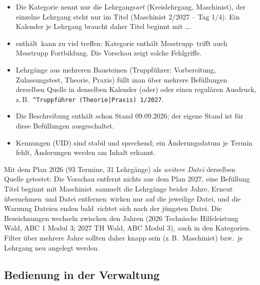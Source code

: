 \documentclass[a4paper,fontsize=10pt]{scrartcl}
\newcommand{\code}[1]{\texttt{#1}}
\begin{document}
\begin{itemize}
  \item Die Kategorie nennt nur die Lehrgangs\emph{art} (\glqq Kreislehrgang,
        Maschinist\grqq), der einzelne Lehrgang steht nur im Titel
        (\glqq Maschinist 2/2027 – Tag 1/4\grqq). Ein Kalender je Lehrgang
        braucht daher \glqq Titel beginnt mit \dots\grqq.
  \item \glqq enthält\grqq\ kann zu viel treffen: Kategorie enthält
        \glqq Messtrupp\grqq\ trifft auch \glqq Messtrupp Fortbildung\grqq.
        Die Vorschau zeigt solche Fehlgriffe.
  \item Lehrgänge aus mehreren Bausteinen (Truppführer: Vorbereitung,
        Zulassungstest, Theorie, Praxis) füllt man über mehrere Befüllungen
        derselben Quelle in denselben Kalender (\glqq oder\grqq) oder einen
        regulären Ausdruck, z.\,B.\ \code{\textasciicircum Truppführer (Theorie|Praxis) 1/2027}.
  \item Die Beschreibung enthält schon \glqq Stand 09.09.2026\grqq; der
        eigene Stand ist für diese Befüllungen ausgeschaltet.
  \item Kennungen (UID) sind stabil und sprechend; ein Änderungsdatum je
        Termin fehlt, Änderungen werden am Inhalt erkannt.
\end{itemize}

Mit dem Plan 2026 (93 Termine, 31 Lehrgänge) als \emph{weitere Datei} derselben
Quelle getestet: Die Vorschau entfernt nichts aus dem Plan 2027, eine
Befüllung \glqq Titel beginnt mit Maschinist\grqq\ sammelt die Lehrgänge
beider Jahre, \glqq Erneut übernehmen\grqq\ und \glqq Datei entfernen\grqq\
wirken nur auf die jeweilige Datei, und die Warnung \glqq Dateien enden
bald\grqq\ richtet sich nach der jüngsten Datei. Die Bezeichnungen wechseln
zwischen den Jahren (2026 \glqq Technische Hilfeleistung Wald\grqq, \glqq ABC 1
Modul 3\grqq; 2027 \glqq TH Wald\grqq, \glqq ABC Modul 3\grqq), auch in den
Kategorien. Filter über mehrere Jahre sollten daher knapp sein (z.\,B.\
\glqq Maschinist\grqq) bzw.\ je Lehrgang neu angelegt werden.

\subsection{Bedienung in der Verwaltung}
\end{document}
